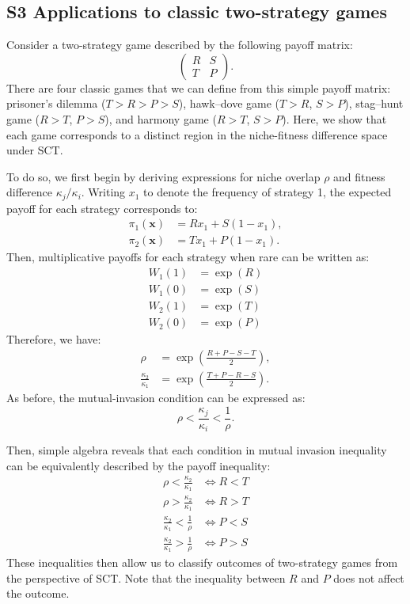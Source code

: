 \documentclass[12pt]{article}
\begin{document}
\subsection*{S3 Applications to classic two-strategy games}

Consider a two-strategy game described by the following payoff matrix:
\begin{equation}
\begin{pmatrix}
R & S \\
T & P
\end{pmatrix}.
\end{equation}
There are four classic games that we can define from this simple payoff matrix:
prisoner’s dilemma ($T>R > P>S$), hawk--dove game ($T>R$, $S>P$), stag--hunt game ($R>T$, $P>S$), and harmony game ($R>T$, $S>P$). 
Here, we show that each game corresponds to a distinct region in the niche-fitness difference space under SCT.

To do so, we first begin by deriving expressions for niche overlap $\rho$ and fitness difference $\kappa_j/\kappa_i$.
Writing $x_1$ to denote the frequency of strategy 1, the expected payoff for each strategy corresponds to:
\begin{align}
\pi_1(\mathbf{x}) &= R x_1 + S(1-x_1),\\
\pi_2(\mathbf{x}) &= T x_1 + P(1-x_1).
\end{align}
Then, multiplicative payoffs for each strategy when rare can be written as:
\begin{align}
W_1(1) &= \exp(R)\\
W_1(0) &= \exp(S)\\
W_2(1) &= \exp(T)\\
W_2(0) &= \exp(P)
\end{align}
Therefore, we have:
\begin{align}
\rho &= \exp\left(\frac{R + P - S - T}{2}\right),\\
\frac{\kappa_2}{\kappa_1} &= \exp\left(\frac{T+P-R-S}{2}\right).
\end{align}
As before, the mutual-invasion condition can be expressed as:
\begin{equation}
\rho < \frac{\kappa_j}{\kappa_i} < \frac{1}{\rho}.
\end{equation}

Then, simple algebra reveals that each condition in mutual invasion inequality can be equivalently described by the payoff inequality:
\begin{align}
\rho < \frac{\kappa_2}{\kappa_1} &\iff R < T\\
\rho > \frac{\kappa_2}{\kappa_1} &\iff R > T\\
\frac{\kappa_2}{\kappa_1} < \frac{1}{\rho} &\iff P < S\\
\frac{\kappa_2}{\kappa_1} > \frac{1}{\rho} &\iff P > S
\end{align}
These inequalities then allow us to classify outcomes of two-strategy games from the perspective of SCT.
Note that the inequality between $R$ and $P$ does not affect the outcome.
\end{document}
